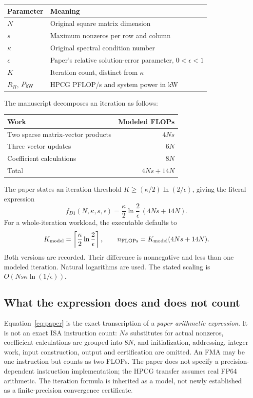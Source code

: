 \documentclass[11pt,a4paper]{article}
\begin{document}
\begin{center}
\begin{tabular}{ll}\toprule Parameter & Meaning \\\midrule
$N$ & Original square matrix dimension \\
$s$ & Maximum nonzeros per row and column \\
$\kappa$ & Original spectral condition number \\
$\epsilon$ & Paper's relative solution-error parameter, $0<\epsilon<1$ \\
$K$ & Iteration count, distinct from $\kappa$ \\
$R_H$, $P_{\rm kW}$ & HPCG PFLOP/s and system power in kW \\\bottomrule
\end{tabular}
\end{center}

The manuscript decomposes an iteration as follows:
\begin{center}
\begin{tabular}{lr}\toprule Work & Modeled FLOPs \\\midrule
Two sparse matrix-vector products & $4Ns$ \\
Three vector updates & $6N$ \\
Coefficient calculations & $8N$ \\\midrule
Total & $4Ns+14N$ \\\bottomrule
\end{tabular}
\end{center}
The paper states an iteration threshold $K\ge(\kappa/2)\ln(2/\epsilon)$, giving the literal expression
\begin{equation}\boxed{
 f_{D1}(N,\kappa,s,\epsilon)=\frac{\kappa}{2}\ln\frac2\epsilon\,(4Ns+14N).
}\label{eq:paper}\end{equation}
For a whole-iteration workload, the executable defaults to
\begin{equation}
 K_{\rm model}=\left\lceil\frac{\kappa}{2}\ln\frac2\epsilon\right\rceil,
 \qquad n_{\rm FLOPs}=K_{\rm model}(4Ns+14N).
\end{equation}
Both versions are recorded. Their difference is nonnegative and less than one modeled iteration. Natural logarithms are used. The stated scaling is $O(Ns\kappa\ln(1/\epsilon))$.

\subsection{What the expression does and does not count}
Equation~\eqref{eq:paper} is the exact transcription of a \emph{paper arithmetic expression}. It is not an exact ISA instruction count: $Ns$ substitutes for actual nonzeros, coefficient calculations are grouped into $8N$, and initialization, addressing, integer work, input construction, output and certification are omitted. An FMA may be one instruction but counts as two FLOPs. The paper does not specify a precision-dependent instruction implementation; the HPCG transfer assumes real FP64 arithmetic. The iteration formula is inherited as a model, not newly established as a finite-precision convergence certificate.
\end{document}
